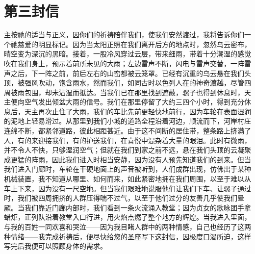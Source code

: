 

\section{第三封信}

\par

\par

主按祂的适当与正义，因你们的祈祷陪伴我们，使我们安然渡过，我将告诉你们一个祂慈爱的明显标记。因为当太阳正照在我们离开后方的地点时，忽然乌云密布，晴空变为深沉的黑暗。接着，一股冷风穿过云层，带来细雨，带着十分潮湿的感觉吹在我们身上，预示着前所未见的大雨；左边雷声不断，闪电与雷声交替，一阵雷声之后，下一阵之前，前后左右的山峦都被云笼罩。已经有沉重的乌云悬在我们头顶，被强风吹动，饱含雨水，然而我们，如同古时以色列人在的神奇渡越，尽管四周被雨包围，却未沾湿而抵达。当我们已在那里找到遮蔽，骡子也得到休息时，天主便向空气发出倾盆大雨的信号。我们在那里停留了大约三四个小时，得到充分休息后，天主再次止住了大雨，我们的车比先前更轻快地前行，因为车轮在表面湿润的泥地上轻易滑过。从那里到我们小城的道路全程沿着河边，顺流而下，河岸村庄连绵不断，都紧邻道路，彼此相距甚近。由于这不间断的居住带，整条路上挤满了人，有的来迎接我们，有的护送我们，在喜悦中混杂着大量的眼泪。此时有微雨，并不令人不快，只够湿润空气；但就在我们到家之前不远，悬在我们头顶的云凝聚成更猛的阵雨，因此我们进入时相当安静，因为没有人预先知道我们的到来。但当我们进入门廊时，车轮在干硬地面上的声音被听到，人们成群出现，仿佛出于某种机械装置，我不知道从哪里、如何而来，如此紧密地拥在我们周围，以至于难以从车上下来，因为没有一尺空地。但当我们艰难地说服他们让我们下车、让骡子通过时，我们被四周拥挤的人群压得喘不过气，以至于他们过分的友善几乎使我们晕厥。当我们靠近门廊内部时，我们看到一条火流涌入教堂；因为贞女的歌咏团手拿蜡炬，正列队沿着教堂入口行进，用火焰点燃了整个地方的辉煌。当我进入里面，与我的百姓一同欢喜和哭泣——因为我目睹人群中的两种情感，自己也经历了这两种情绪——我完成祈祷后，便尽快给您的圣座写下这封信，因极度口渴所迫，这样写完后我便可以照顾身体的需求。\par


